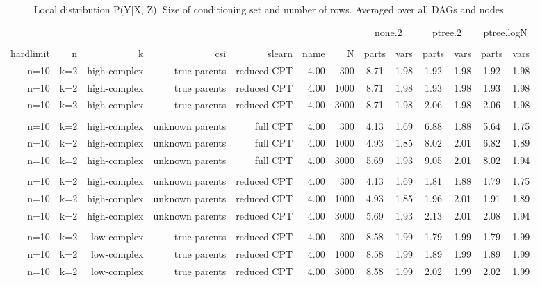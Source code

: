 \begin{table}[ht]
\centering
\caption{Local distribution P(Y|X, Z). Size of conditioning set and number of rows. Averaged over all DAGs and nodes.} 
\begin{tabular}{rrrrrrr|cc|cc|cc}
  \toprule
   & & & & & & &\multicolumn{2}{c}{none.2}&\multicolumn{2}{c}{ptree.2}&\multicolumn{2}{c}{ptree.logN}   \\ 
 \cline{8-13}  \\ 
 hardlimit & n & k & csi & slearn & name & N & parts & vars & parts & vars & parts & vars  \\ 
 \midrule
n=10 & k=2 & high-complex & true parents & reduced CPT & 4.00 & 300 & 8.71 & 1.98 & 1.92 & 1.98 & 1.92 & 1.98 \\ 
  n=10 & k=2 & high-complex & true parents & reduced CPT & 4.00 & 1000 & 8.71 & 1.98 & 1.93 & 1.98 & 1.93 & 1.98 \\ 
  n=10 & k=2 & high-complex & true parents & reduced CPT & 4.00 & 3000 & 8.71 & 1.98 & 2.06 & 1.98 & 2.06 & 1.98 \\ 
   \\ 
n=10 & k=2 & high-complex & unknown parents & full CPT & 4.00 & 300 & 4.13 & 1.69 & 6.88 & 1.88 & 5.64 & 1.75 \\ 
  n=10 & k=2 & high-complex & unknown parents & full CPT & 4.00 & 1000 & 4.93 & 1.85 & 8.02 & 2.01 & 6.82 & 1.89 \\ 
  n=10 & k=2 & high-complex & unknown parents & full CPT & 4.00 & 3000 & 5.69 & 1.93 & 9.05 & 2.01 & 8.02 & 1.94 \\ 
   \\ 
n=10 & k=2 & high-complex & unknown parents & reduced CPT & 4.00 & 300 & 4.13 & 1.69 & 1.81 & 1.88 & 1.79 & 1.75 \\ 
  n=10 & k=2 & high-complex & unknown parents & reduced CPT & 4.00 & 1000 & 4.93 & 1.85 & 1.96 & 2.01 & 1.91 & 1.89 \\ 
  n=10 & k=2 & high-complex & unknown parents & reduced CPT & 4.00 & 3000 & 5.69 & 1.93 & 2.13 & 2.01 & 2.08 & 1.94 \\ 
   \\ 
n=10 & k=2 & low-complex & true parents & reduced CPT & 4.00 & 300 & 8.58 & 1.99 & 1.79 & 1.99 & 1.79 & 1.99 \\ 
  n=10 & k=2 & low-complex & true parents & reduced CPT & 4.00 & 1000 & 8.58 & 1.99 & 1.89 & 1.99 & 1.89 & 1.99 \\ 
  n=10 & k=2 & low-complex & true parents & reduced CPT & 4.00 & 3000 & 8.58 & 1.99 & 2.02 & 1.99 & 2.02 & 1.99 \\ 

\end{tabular}
\end{table}
